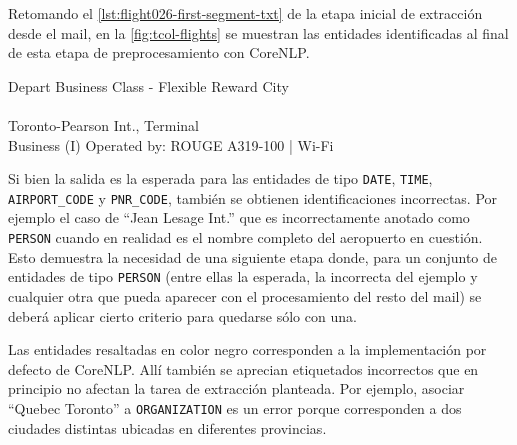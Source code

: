 Retomando el \autoref{lst:flight026-first-segment-txt} de la etapa inicial de extracción desde el mail, en la
\autoref{fig:tcol-flights} se muestran las entidades identificadas al final de esta etapa de preprocesamiento con CoreNLP\@.
\pagebreak
\begin{tcolorbox}[
    colback=black!2,
    colframe=black!35,
    title={Entidades reconocidas en un fragmento de texto de una reserva aérea},
    breakable
]

    \medskip
    \noindent

    {\raggedright%
    Depart  Business Class {-} Flexible Reward  City
      \\
       \\
     Toronto-Pearson Int., Terminal  \\
      Business (I) Operated by:  ROUGE A319{-}100 | Wi-Fi\par
    }

    \medskip
    \noindent

\end{tcolorbox}
\noindent\begin{minipage}{\linewidth}
             \captionsetup{type=figure,hypcap=false}
             \caption{Entidades reconocidas.}%
             \label{fig:tcol-flights}
\end{minipage}

Si bien la salida es la esperada para las entidades de tipo \texttt{DATE}, \texttt{TIME}, \texttt{AIRPORT\_CODE} y
\texttt{PNR\_CODE}, también se obtienen identificaciones incorrectas.
Por ejemplo el caso de \enquote{Jean Lesage Int.} que es incorrectamente anotado como \texttt{PERSON} cuando en realidad
es el nombre completo del aeropuerto en cuestión.
Esto demuestra la necesidad de una siguiente etapa donde, para un conjunto de entidades de tipo \texttt{PERSON} (entre
ellas la esperada, la incorrecta del ejemplo y cualquier otra que pueda aparecer con el procesamiento del resto del mail)
se deberá aplicar cierto criterio para quedarse sólo con una.

Las entidades resaltadas en color negro corresponden a la implementación por defecto de CoreNLP\@.
Allí también se aprecian etiquetados incorrectos que en principio no afectan la tarea de extracción planteada.
Por ejemplo, asociar ``Quebec Toronto'' a \texttt{ORGANIZATION} es un error porque corresponden a dos ciudades distintas
ubicadas en diferentes provincias.

